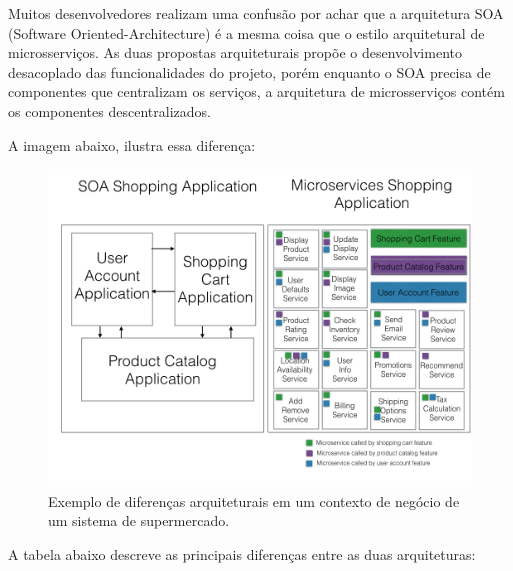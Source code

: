 Muitos desenvolvedores realizam uma confusão por achar que a arquitetura SOA (Software Oriented-Architecture) é a mesma coisa que o estilo arquitetural de microsserviços. As duas propostas arquiteturais propõe o desenvolvimento desacoplado das funcionalidades do projeto, porém enquanto o SOA precisa de componentes que centralizam os serviços, a arquitetura de microsserviços contém os componentes descentralizados.\cite{gunter}

A imagem abaixo, ilustra essa diferença:

\begin{figure}[H]
	\centering
	\includegraphics[width=15cm]{figuras/microsservicos.png}
	\caption{Exemplo de diferenças arquiteturais em um contexto de negócio de um sistema de supermercado.
	} \label{microsservicos}
\end{figure}

A tabela abaixo descreve as principais diferenças entre as duas arquiteturas:

